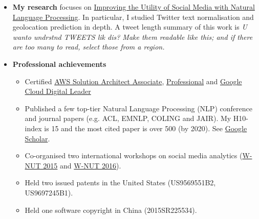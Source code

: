 \documentclass[letterpaper,12pt]{article}[leftmargin=*]
\def \entryspacing {-0pt}
\newcommand{\resumeEntryStart}{\begin{itemize}[leftmargin=2.5mm]}
\newcommand{\resumeEntryEnd}{\end{itemize}\vspace{\entryspacing}}
\newcommand{\resumeItemListStart}{\begin{itemize}[leftmargin=4.5mm]}
\newcommand{\resumeItemListEnd}{\end{itemize}}
\newcommand{\resumeItem}[1]{
  \item\small{
    {#1 \vspace{-2pt}}
  }
}
\newcommand{\resumeEntryS}[2]{
  \item[]\small{
    \textbf{\color{primary}#1 }{ #2 \vspace{-6pt}}
  }
}
\begin{document}
 \resumeEntryStart
  \resumeEntryS{My research}{focuses on \href{https://minerva-access.unimelb.edu.au/bitstream/handle/11343/41029/thesis.pdf?sequence=1}{Improving the Utility of Social Media with Natural Language Processing}. In particular, I studied Twitter text normalisation and geolocation prediction in depth. A tweet length summary of this work is \textit{U wanto undrstnd TWEETS lik dis? Make them readable like this; and if there are too many to read, select those from a region.}}
\resumeEntryS{Professional achievements}{
    \resumeItemListStart
      \resumeItem {Certified \href{https://www.youracclaim.com/badges/c7ac42bd-fe9a-4f13-83b3-80cea3a8cc57/public_url}{AWS Solution Architect Associate}, \href{https://www.youracclaim.com/badges/f7d5a6a9-caaf-472c-b703-207ae1046147/public_url}{Professional} and \href{https://www.credential.net/2b25573b-f6bd-44aa-93b8-b8678449a999?record_view=true}{Google Cloud Digital Leader}}
      \resumeItem {Published a few top-tier Natural Language Processing (NLP) conference and journal papers (e.g. ACL, EMNLP, COLING and JAIR). My H10-index is 15 and the most cited paper is over 500 (by 2020). See \href{https://scholar.google.com/citations?hl=en&user=ZRr4vn8AAAAJ}{Google Scholar}.}
      \resumeItem {Co-organised two international workshops on social media analytics (\href{https://noisy-text.github.io/2015/}{W-NUT 2015} and \href{https://noisy-text.github.io/2015/}{W-NUT 2016}).}
      \resumeItem {Held two issued patents in the United States (US9569551B2, US9697245B1).}
      \resumeItem {Held one software copyright in China (2015SR225534).}
    \resumeItemListEnd}

 \resumeEntryEnd
\end{document}
